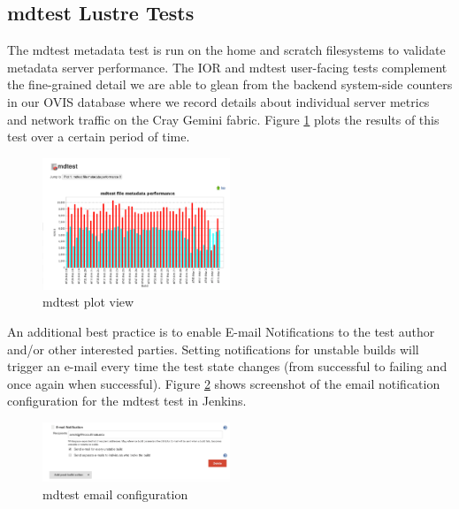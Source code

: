 \documentclass[10pt, conference, compsocconf]{IEEEtran}
\begin{document}
\subsection{mdtest Lustre Tests}
The mdtest metadata test is run on the home and scratch filesystems to validate metadata server performance.  The IOR and mdtest user-facing tests complement the fine-grained detail we are able to glean from the backend system-side counters in our OVIS \cite{OVIS} database where we record details about individual server metrics and network traffic on the Cray Gemini fabric. Figure \ref{fig:mdtest-plot} plots the results of this test over a certain period of time. 
\begin{figure}[H]
\centering
\includegraphics[width=0.5\textwidth]{mdtest-plot}
\caption{mdtest plot view }
\label{fig:mdtest-plot}
\end{figure}

An additional best practice is to enable E-mail Notifications to the test author and/or other interested parties. Setting notifications for unstable builds will trigger an e-mail every time the test state changes (from successful to failing and once again when successful). Figure \ref{fig:mdtest-config-email} shows screenshot of the email notification configuration for the mdtest test in Jenkins.
\begin{figure}[H]
\centering
\includegraphics[width=0.5\textwidth]{mdtest-config-email}
\caption{ mdtest email configuration }
\label{fig:mdtest-config-email}
\end{figure}
\end{document}
